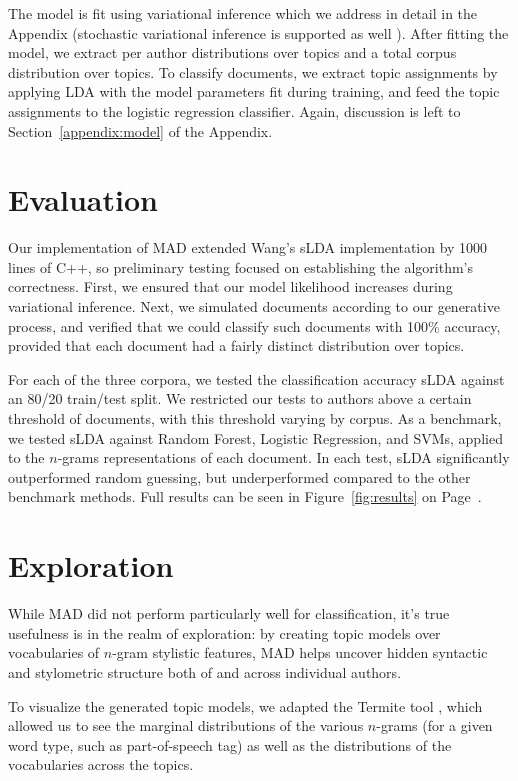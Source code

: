 \documentclass[14pt]{article} %
\theoremstyle{plain}
\theoremstyle{definition}
\theoremstyle{remark}
\begin{document}
The model is fit using variational inference \cite{wainwright2008graphical} which we address in detail in the Appendix (stochastic variational inference is supported as well \cite{hoffman2013stochastic}). After fitting the model, we extract per author distributions over topics and a total corpus distribution over topics. To classify documents, we extract topic assignments by applying LDA with the model parameters fit during training, and feed the topic assignments to the logistic regression classifier. Again, discussion is left to Section~\ref{appendix:model} of the Appendix. 

\section{Evaluation}

Our implementation of MAD extended Wang's sLDA implementation by 1000 lines of C++, so preliminary testing focused on establishing the algorithm's correctness. First, we ensured that our model likelihood increases during variational inference. Next, we simulated documents according to our generative process, and verified that we could classify such documents with 100\% accuracy, provided that each document had a fairly distinct distribution over topics. 

For each of the three corpora, we tested the classification accuracy sLDA against an 80/20 train/test split. We restricted our tests to authors above a certain threshold of documents, with this threshold varying by corpus. As a benchmark, we tested sLDA against Random Forest, Logistic Regression, and SVMs, applied to the $n$-grams representations of each document. In each test, sLDA significantly outperformed random guessing, but underperformed compared to the other benchmark methods. Full results can be seen in Figure~\ref{fig:results} on Page~\pageref{fig:results}.

\section{Exploration}

While MAD did not perform particularly well for classification, it's true usefulness is in the realm of exploration: by creating topic models over vocabularies of $n$-gram stylistic features, MAD helps uncover hidden syntactic and stylometric structure both of and across individual authors.

To visualize the generated topic models, we adapted the Termite tool \citep{Termite}, which allowed us to see the marginal distributions of the various $n$-grams (for a given word type, such as part-of-speech tag) as well as the distributions of the vocabularies across the topics.
\end{document}
